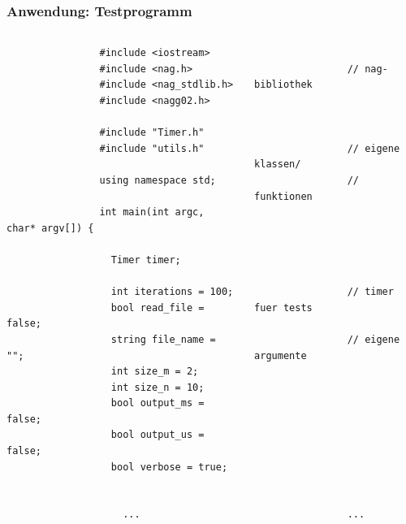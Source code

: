 \documentclass{beamer}
\begin{document}
\begin{frame}[fragile]
  \frametitle{Anwendung: Testprogramm}
	
	\begin{columns}
			\begin{lstlisting}
				#include <iostream>
				#include <nag.h>
				#include <nag_stdlib.h>
				#include <nagg02.h>
				
				#include "Timer.h"
				#include "utils.h"
				
				using namespace std;
				
				int main(int argc, char* argv[]) {
	
				  Timer timer;
				
				  int iterations = 100;
				  bool read_file = false;
				  string file_name = "";
				  int size_m = 2;
				  int size_n = 10;
				  bool output_ms = false;
				  bool output_us = false;
				  bool verbose = true;
					
					
					...
			\end{lstlisting}
			\begin{lstlisting}
								
				// nag-bibliothek
				
				
				
				// eigene klassen/
				// funktionen
				
				
				
								
				
				// timer fuer tests
				
				// eigene argumente
				
				
				
				
				
				
				
				
				
				...
			\end{lstlisting}
	\end{columns}
\end{frame}
\end{document}

